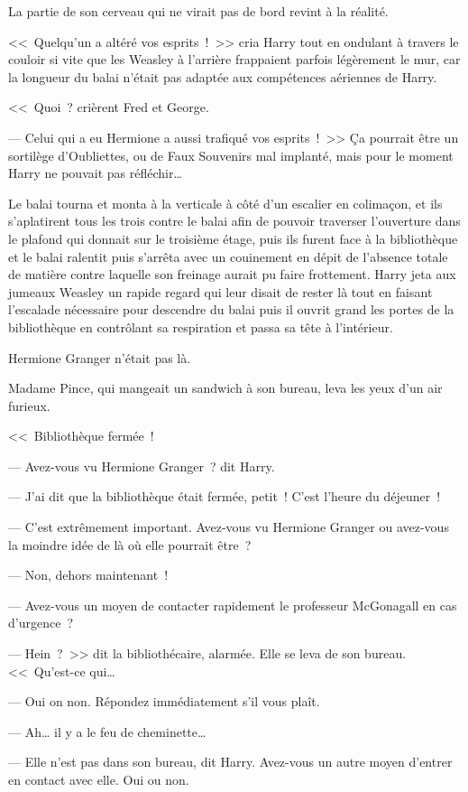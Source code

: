 La partie de son cerveau qui ne virait pas de bord revint à la réalité.

<<~Quelqu'un a altéré vos esprits~!~>> cria Harry tout en ondulant à travers le couloir si vite que les Weasley à l'arrière frappaient parfois légèrement le mur, car la longueur du balai n'était pas adaptée aux compétences aériennes de Harry.

<<~Quoi~? crièrent Fred et George.

--- Celui qui a eu Hermione a aussi trafiqué vos esprits~!~>> Ça pourrait être un sortilège d'Oubliettes, ou de Faux Souvenirs mal implanté, mais pour le moment Harry ne pouvait pas réfléchir…

Le balai tourna et monta à la verticale à côté d'un escalier en colimaçon, et ils s'aplatirent tous les trois contre le balai afin de pouvoir traverser l'ouverture dans le plafond qui donnait sur le troisième étage, puis ils furent face à la bibliothèque et le balai ralentit puis s'arrêta avec un couinement en dépit de l'absence totale de matière contre laquelle son freinage aurait pu faire frottement. Harry jeta aux jumeaux Weasley un rapide regard qui leur disait de rester là tout en faisant l'escalade nécessaire pour descendre du balai puis il ouvrit grand les portes de la bibliothèque en contrôlant sa respiration et passa sa tête à l'intérieur.

Hermione Granger n'était pas là.

Madame Pince, qui mangeait un sandwich à son bureau, leva les yeux d'un air furieux.

<<~Bibliothèque fermée~!

--- Avez-vous vu Hermione Granger~? dit Harry.

--- J'ai dit que la bibliothèque était fermée, petit~! C'est l'heure du déjeuner~!

--- C'est extrêmement important. Avez-vous vu Hermione Granger ou avez-vous la moindre idée de là où elle pourrait être~?

--- Non, dehors maintenant~!

--- Avez-vous un moyen de contacter rapidement le professeur McGonagall en cas d'urgence~?

--- Hein~?~>> dit la bibliothécaire, alarmée. Elle se leva de son bureau. <<~Qu'est-ce qui…

--- Oui on non. Répondez immédiatement s'il vous plaît.

--- Ah… il y a le feu de cheminette…

--- Elle n'est pas dans son bureau, dit Harry. Avez-vous un autre moyen d'entrer en contact avec elle. Oui ou non.

